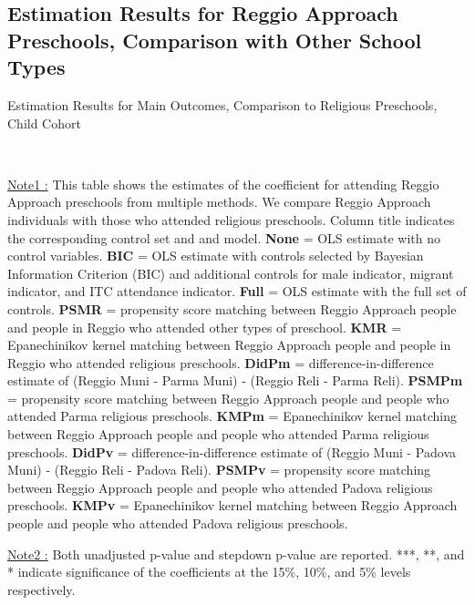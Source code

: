 \subsection{Estimation Results for Reggio Approach Preschools, Comparison with Other School Types} \label{app:comparison-reli-stat}


\begin{table}[H] \caption{Estimation Results for Main Outcomes, Comparison to Religious Preschools, Child Cohort} \label{ols-M-child-reg-reli}
\scalebox{0.59}{}
\vspace{1ex} \\
\footnotesize\raggedright{\underline{Note1 :} This table shows the estimates of the coefficient for attending Reggio Approach preschools from multiple methods. We compare Reggio Approach individuals with those who attended religious preschools. Column title indicates the corresponding control set and and model. \textbf{None} = OLS estimate with no control variables. \textbf{BIC} = OLS estimate with controls selected by Bayesian Information Criterion (BIC) and additional controls for male indicator, migrant indicator, and ITC attendance indicator. \textbf{Full} = OLS estimate with the full set of controls. \textbf{PSMR} =  propensity score matching between Reggio Approach people and people in Reggio who attended other types of preschool. \textbf{KMR} = Epanechinikov kernel matching between Reggio Approach people and people in Reggio who attended religious preschools. \textbf{DidPm} = difference-in-difference estimate of (Reggio Muni - Parma Muni) - (Reggio Reli - Parma Reli). \textbf{PSMPm} = propensity score matching between Reggio Approach people and people who attended Parma religious preschools. \textbf{KMPm} = Epanechinikov kernel matching between Reggio Approach people and people who attended Parma religious preschools. \textbf{DidPv} = difference-in-difference estimate of (Reggio Muni - Padova Muni) - (Reggio Reli - Padova Reli). \textbf{PSMPv} = propensity score matching between Reggio Approach people and people who attended Padova religious preschools. \textbf{KMPv} = Epanechinikov kernel matching between Reggio Approach people and people who attended Padova religious preschools.} 

\footnotesize\raggedright{\underline{Note2 :} Both unadjusted p-value and stepdown p-value are reported. ***, **, and * indicate significance of the coefficients at the 15\%, 10\%, and 5\% levels respectively.}

\end{table}



